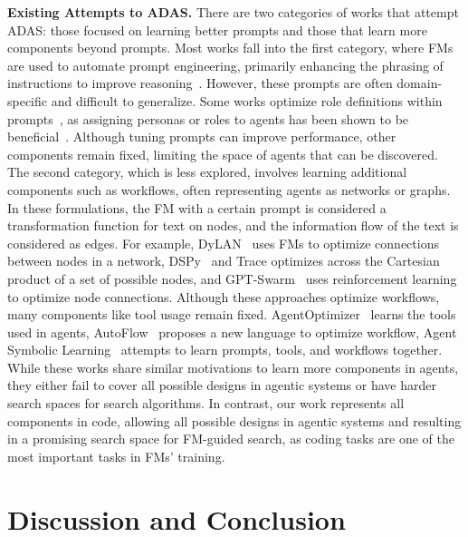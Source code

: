 \documentclass{article} %
\newcommand{\problem}{ADAS\xspace}
\begin{document}
\noindent\textbf{Existing Attempts to \problem.}\hspace{0.5em} There are two categories of works that attempt \problem: those focused on learning better prompts and those that learn more components beyond prompts. Most works fall into the first category, where FMs are used to automate prompt engineering, primarily enhancing the phrasing of instructions to improve reasoning~\citep{yang2024OPRO,fernando2024promptbreeder,zhou2024self,yuksekgonul2024textgrad}. However, these prompts are often domain-specific and difficult to generalize. Some works optimize role definitions within prompts~\citep{yuan2024evoagent,chen2023agentverse,chen2023auto,wu2023autogen}, as assigning personas or roles to agents has been shown to be beneficial~\citep{xu2023expertprompting}. Although tuning prompts can improve performance, other components remain fixed, limiting the space of agents that can be discovered. The second category, which is less explored, involves learning additional components such as workflows, often representing agents as networks or graphs. In these formulations, the FM with a certain prompt is considered a transformation function for text on nodes, and the information flow of the text is considered as edges. For example, DyLAN~\citep{liu2023dynamic} uses FMs to optimize connections between nodes in a network, DSPy~\citep{khattab2024dspy} and Trace \citep{cheng2025trace} optimizes across the Cartesian product of a set of possible nodes, and GPT-Swarm~\citep{zhugegptswarm} uses reinforcement learning to optimize node connections. Although these approaches optimize workflows, many components like tool usage remain fixed. AgentOptimizer~\citep{zhang2024agentoptimizer} learns the tools used in agents, AutoFlow~\citep{li2024autoflow} proposes a new language to optimize workflow, Agent Symbolic Learning~\citep{zhou2024symbolic} attempts to learn prompts, tools, and workflows together. While these works share similar motivations to learn more components in agents, they either fail to cover all possible designs in agentic systems or have harder search spaces for search algorithms. In contrast, our work represents all components in code, allowing all possible designs in agentic systems and resulting in a promising search space for FM-guided search, as coding tasks are one of the most important tasks in FMs' training.

\section{Discussion and Conclusion}
\label{section:future_work}
\end{document}
